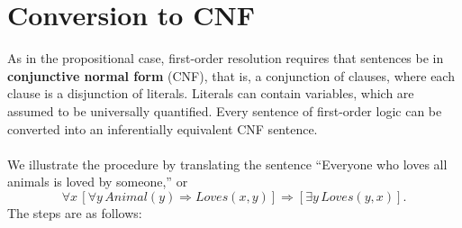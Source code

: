 \section{Conversion to CNF}
As in the propositional case, first-order resolution requires that sentences be in \textbf{conjunctive
normal form} (CNF), that is, a conjunction of clauses, where each clause is a disjunction of literals. Literals can contain variables, which are assumed to be universally quantified. Every sentence of first-order logic can be converted into an inferentially equivalent CNF
sentence.\\\\
We illustrate the procedure by translating the sentence “Everyone who loves all animals is loved by someone,” or
\[\forall x \, [\forall y \, Animal(y) \Rightarrow Loves(x, y)] \Rightarrow [\exists y \, Loves(y, x)].\]
The steps are as follows:

